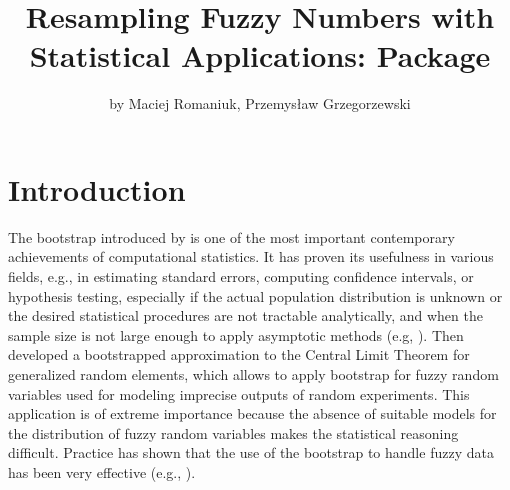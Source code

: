   
  \title{Resampling Fuzzy Numbers with Statistical Applications:  Package}
  \author{by Maciej Romaniuk, Przemys{\l}aw Grzegorzewski}
  
  \maketitle
  
  


\section{Introduction} 

The bootstrap introduced by \cite{Efron} is one of the most important contemporary achievements of computational statistics. 
It has proven its usefulness in various fields, e.g., in estimating standard errors, computing confidence intervals, or hypothesis testing, especially if the actual population  distribution is unknown or the desired statistical procedures are not tractable analytically, and when the sample size is not large enough to apply asymptotic methods (e.g, \cite{EfroTibs93}). Then \cite{gine} developed a bootstrapped approximation to the Central Limit Theorem for generalized random elements, which allows to apply bootstrap for fuzzy random variables used for modeling imprecise outputs of random experiments. This application is of extreme importance because the absence of suitable models for the distribution of fuzzy random variables makes the statistical reasoning difficult. Practice has shown that the use of the bootstrap to handle fuzzy data has been very effective (e.g., \cite{gil,gonzalezrodriguez,montenegro2004,LUBIANO2016918,LUBIANO2017128}).


